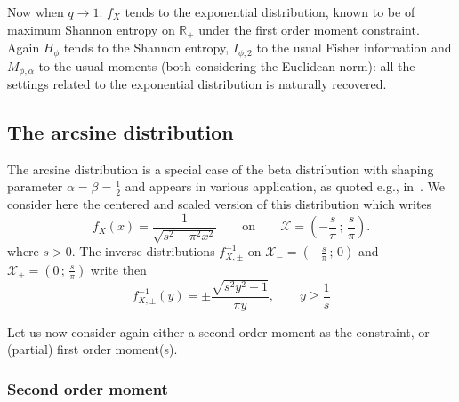 \documentclass[entropy,article,submit,moreauthors,pdftex]{Definitions/mdpi}
\newcommand{\SZ}[1]{{\color{blue} #1}}                                       %
\def\Rset{\mathbb{R}}%
\def\X{\mathcal{X}}%
\begin{document}
Now when $q \to 1$: $f_X$ tends  to the exponential distribution, known to be of
maximum   Shannon  entropy   on   $\Rset_+$  under   the   first  order   moment
constraint. Again  $H_\phi$ tends  to the Shannon  entropy, $I_{\phi,2}$  to the
usual  Fisher  information and  $M_{\phi,\alpha}$  to  the usual  moments  (both
considering the  Euclidean norm):  all the settings  related to  the exponential
distribution is naturally recovered.




\subsection{The arcsine distribution}
\label{subsecapp:Arcsine}

The arcsine distribution is a special case of the beta distribution with shaping
parameter $\alpha = \beta = \frac12$  \SZ{and appears in various application, as
  quoted e.g., in~\cite{JohKot95:v2}}. We consider  here the centered and scaled
version of this distribution which writes\SZ{
%
\[
f_X(x) = \frac{1}{\sqrt{  s^2 - \pi^2 x^2}} \qquad  \mbox{on} \qquad \X =
\left( - \frac{s}{\pi} \, ; \, \frac{s}{\pi} \right).
\]
%
where $s >  0$.  The inverse distributions $f_{X,\pm}^{-1}$ on  $\X_- = \left( -
\frac{s}{\pi} \,  ; \, 0  \right)$ and  $\X_+ = \left(  0 \, ;  \, \frac{s}{\pi}
\right)$ write then
%
\[
f_{X,\pm}^{-1}(y) = \pm \frac{\sqrt{s^2  y^2 - 1}}{\pi y}, \qquad y
\ge \frac{1}{s}
\]
}


Let us  now consider again  either a second order  moment as the  constraint, or
(partial) first order moment(s).



\subsubsection{Second order moment}
\label{subsubsecapp:ArcsineSecondOrder}
\end{document}
